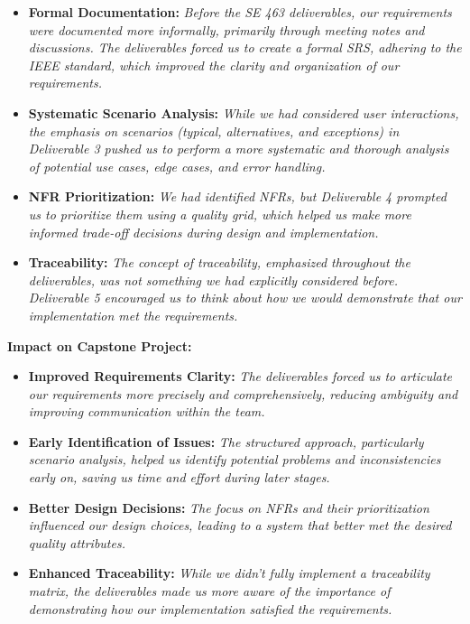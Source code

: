 \documentclass{article}
\begin{document}
\begin{itemize}
    \item \textbf{Formal Documentation:} \textit{Before the SE 463 deliverables, our requirements were documented more informally, primarily through meeting notes and discussions. The deliverables forced us to create a formal SRS, adhering to the IEEE standard, which improved the clarity and organization of our requirements.}
    \item \textbf{Systematic Scenario Analysis:} \textit{While we had considered user interactions, the emphasis on scenarios (typical, alternatives, and exceptions) in Deliverable 3 pushed us to perform a more systematic and thorough analysis of potential use cases, edge cases, and error handling.}
    \item \textbf{NFR Prioritization:} \textit{We had identified NFRs, but Deliverable 4 prompted us to prioritize them using a quality grid, which helped us make more informed trade-off decisions during design and implementation.}
    \item \textbf{Traceability:} \textit{The concept of traceability, emphasized throughout the deliverables, was not something we had explicitly considered before. Deliverable 5 encouraged us to think about how we would demonstrate that our implementation met the requirements.}
\end{itemize}

\textbf{Impact on Capstone Project:}

\begin{itemize}
    \item \textbf{Improved Requirements Clarity:} \textit{The deliverables forced us to articulate our requirements more precisely and comprehensively, reducing ambiguity and improving communication within the team.}
    \item \textbf{Early Identification of Issues:} \textit{The structured approach, particularly scenario analysis, helped us identify potential problems and inconsistencies early on, saving us time and effort during later stages.}
    \item \textbf{Better Design Decisions:} \textit{The focus on NFRs and their prioritization influenced our design choices, leading to a system that better met the desired quality attributes.}
    \item \textbf{Enhanced Traceability:} \textit{While we didn't fully implement a traceability matrix, the deliverables made us more aware of the importance of demonstrating how our implementation satisfied the requirements.}
\end{itemize}
\end{document}

